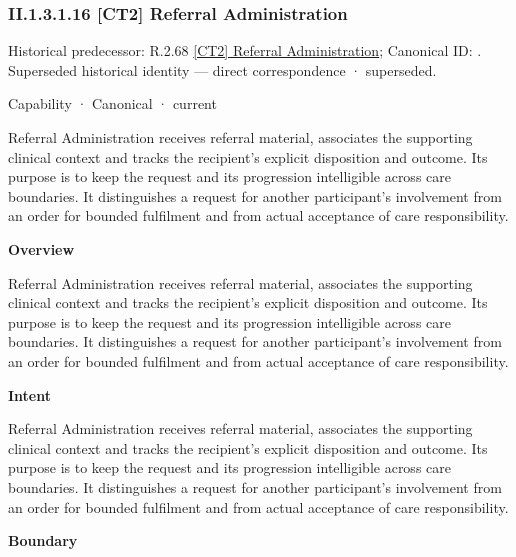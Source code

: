 \subsubsection*{II.1.3.1.16 [CT2] Referral Administration}
\label{navigation:II.1.3.1.16}

{\small Historical predecessor: R.2.68 \hyperref[element:5b0ccf4b30054145952c298b348ed266]{[CT2] Referral Administration}; Canonical ID: \texttt{}. Superseded historical identity — direct correspondence · superseded.}\par
\label{element:ae0de25600ee416aa24d2a167b64f230}
{\small Capability · Canonical · current}\par

Referral Administration receives referral material, associates the supporting clinical context and tracks the recipient's explicit disposition and outcome. Its purpose is to keep the request and its progression intelligible across care boundaries. It distinguishes a request for another participant's involvement from an order for bounded fulfilment and from actual acceptance of care responsibility.



\textbf{Overview}



Referral Administration receives referral material, associates the supporting clinical context and tracks the recipient's explicit disposition and outcome. Its purpose is to keep the request and its progression intelligible across care boundaries. It distinguishes a request for another participant's involvement from an order for bounded fulfilment and from actual acceptance of care responsibility.



\textbf{Intent}



Referral Administration receives referral material, associates the supporting clinical context and tracks the recipient's explicit disposition and outcome. Its purpose is to keep the request and its progression intelligible across care boundaries. It distinguishes a request for another participant's involvement from an order for bounded fulfilment and from actual acceptance of care responsibility.



\textbf{Boundary}



